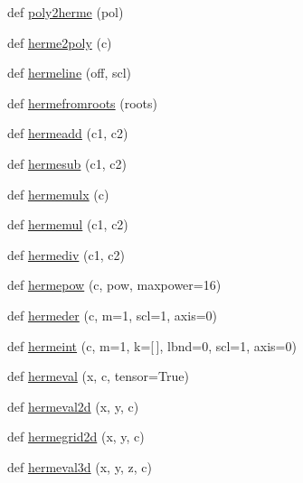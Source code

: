 \begin{DoxyCompactItemize}
\item 
def \hyperlink{namespacenumpy_1_1polynomial_1_1hermite__e_ac177ab24e638db759def7dd2ff5c6b27}{poly2herme} (pol)
\item 
def \hyperlink{namespacenumpy_1_1polynomial_1_1hermite__e_a30a68223aae03cc27f8cb5849e9e9a40}{herme2poly} (c)
\item 
def \hyperlink{namespacenumpy_1_1polynomial_1_1hermite__e_afdaf2116be873126d2371dd6fce4a5d4}{hermeline} (off, scl)
\item 
def \hyperlink{namespacenumpy_1_1polynomial_1_1hermite__e_a04b538fffbe3c80080cbf3ee16304ad5}{hermefromroots} (roots)
\item 
def \hyperlink{namespacenumpy_1_1polynomial_1_1hermite__e_a75aa83392bc7ebb2307c9151784b91d6}{hermeadd} (c1, c2)
\item 
def \hyperlink{namespacenumpy_1_1polynomial_1_1hermite__e_a964e0d1ada0545b0612243777d259194}{hermesub} (c1, c2)
\item 
def \hyperlink{namespacenumpy_1_1polynomial_1_1hermite__e_ab9821e5cf05e8c8ee5f7504928f3a875}{hermemulx} (c)
\item 
def \hyperlink{namespacenumpy_1_1polynomial_1_1hermite__e_a90464e580ffd730a57afd64261d55e8a}{hermemul} (c1, c2)
\item 
def \hyperlink{namespacenumpy_1_1polynomial_1_1hermite__e_a3598edc81fdb0924ca25ce3afc084339}{hermediv} (c1, c2)
\item 
def \hyperlink{namespacenumpy_1_1polynomial_1_1hermite__e_ae5ee57ea266379a1d52c7c0e4a03d443}{hermepow} (c, pow, maxpower=16)
\item 
def \hyperlink{namespacenumpy_1_1polynomial_1_1hermite__e_a5146abcb0e10bb656e4595c83d2e9806}{hermeder} (c, m=1, scl=1, axis=0)
\item 
def \hyperlink{namespacenumpy_1_1polynomial_1_1hermite__e_ac216c954fc1da9cad4c673ed4f2bc9d1}{hermeint} (c, m=1, k=\mbox{[}$\,$\mbox{]}, lbnd=0, scl=1, axis=0)
\item 
def \hyperlink{namespacenumpy_1_1polynomial_1_1hermite__e_a57c60860d471eb7e395d59e1f07a7bc0}{hermeval} (x, c, tensor=True)
\item 
def \hyperlink{namespacenumpy_1_1polynomial_1_1hermite__e_aca83941bc0b61a6ad3ab7c69809e313c}{hermeval2d} (x, y, c)
\item 
def \hyperlink{namespacenumpy_1_1polynomial_1_1hermite__e_a13d5e2334d3c12f9221c2772c6200a15}{hermegrid2d} (x, y, c)
\item 
def \hyperlink{namespacenumpy_1_1polynomial_1_1hermite__e_a363bddfd2b0cbd6b2006a54827bcfc20}{hermeval3d} (x, y, z, c)

\end{DoxyCompactItemize}
